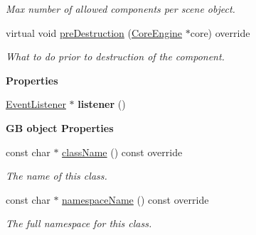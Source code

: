 \begin{Indent}
\begin{DoxyCompactItemize}
\begin{DoxyCompactList}\small\item\em Max number of allowed components per scene object. \end{DoxyCompactList}\item 
\mbox{\label{classrev_1_1_listener_component_a9e2d03f43c65e61b7c13954db69bffb5}} 
virtual void \mbox{\hyperlink{classrev_1_1_listener_component_a9e2d03f43c65e61b7c13954db69bffb5}{pre\+Destruction}} (\mbox{\hyperlink{classrev_1_1_core_engine}{Core\+Engine}} $\ast$core) override
\begin{DoxyCompactList}\small\item\em What to do prior to destruction of the component. \end{DoxyCompactList}\end{DoxyCompactItemize}
\end{Indent}
\begin{Indent}\textbf{ Properties}\par
\begin{DoxyCompactItemize}
\item 
\mbox{\label{classrev_1_1_listener_component_a317551e4ed5c933d1f84c4585b6becbb}} 
\mbox{\hyperlink{classrev_1_1_event_listener}{Event\+Listener}} $\ast$ {\bfseries listener} ()
\end{DoxyCompactItemize}
\end{Indent}
\begin{Indent}\textbf{ GB object Properties}\par
\begin{DoxyCompactItemize}
\item 
const char $\ast$ \mbox{\hyperlink{classrev_1_1_listener_component_ab25dc63421b42bf388e9b1e57e635661}{class\+Name}} () const override
\begin{DoxyCompactList}\small\item\em The name of this class. \end{DoxyCompactList}\item 
const char $\ast$ \mbox{\hyperlink{classrev_1_1_listener_component_a83f62effee9c503dd7ee0b0322b0057e}{namespace\+Name}} () const override
\begin{DoxyCompactList}\small\item\em The full namespace for this class. \end{DoxyCompactList}\end{DoxyCompactItemize}
\end{Indent}
